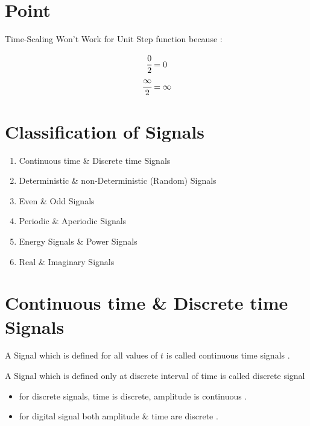 \documentclass[12pt]{article}
\begin{document}
\section{Point}

Time-Scaling Won't Work for Unit Step function because :


\begin{align*}
\cfrac{0}{2} &= 0 \\
\cfrac{\infty}{2} &= \infty \\
\end{align*}





\section{Classification of Signals}



\begin{enumerate}
	\item Continuous time \& Discrete time Signals
	\item Deterministic \& non-Deterministic (Random) Signals
	\item Even \& Odd Signals
	\item Periodic \& Aperiodic Signals
	\item Energy Signals \& Power Signals
	\item Real \& Imaginary Signals
\end{enumerate}







\section{Continuous time \& Discrete time Signals}


A Signal which is defined for all values of $t$ is called continuous time signals .

\noindent
A Signal which is defined only at discrete interval of time is called discrete signal


\begin{itemize}
	\item for discrete signals, time is discrete, amplitude is continuous .
	\item for digital signal both amplitude \& time are discrete .
\end{itemize}
\end{document}
